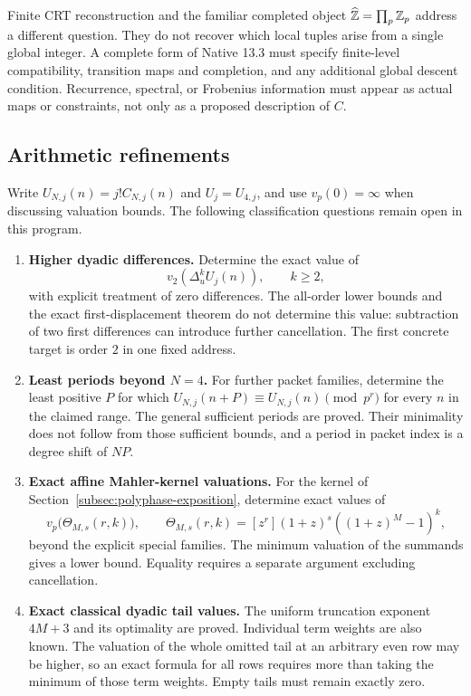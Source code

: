 Finite CRT reconstruction and the familiar completed object
$\widehat{\mathbb Z}=\prod_p\mathbb Z_p$ address a different question. They do not recover
which local tuples arise from a single global integer. A complete form of
Native 13.3 must specify finite-level compatibility, transition maps and
completion, and any additional global descent condition. Recurrence,
spectral, or Frobenius information must appear as actual maps or constraints,
not only as a proposed description of $C$.

\subsection{Arithmetic refinements}
\label{subsec:arithmetic-open}

Write $U_{N,j}(n)=j!C_{N,j}(n)$ and $U_j=U_{4,j}$, and use
$v_p(0)=\infty$ when discussing valuation bounds. The following classification
questions remain open in this program.

\begin{enumerate}
\item \textbf{Higher dyadic differences.}
Determine the exact value of
\[
v_2\!\left(\Delta_u^kU_j(n)\right),\qquad k\geq2,
\]
with explicit treatment of zero differences. The all-order lower bounds and
the exact first-displacement theorem do not determine this value: subtraction
of two first differences can introduce further cancellation. The first
concrete target is order $2$ in one fixed address.

\item \textbf{Least periods beyond $N=4$.}
For further packet families, determine the least positive $P$ for which
$U_{N,j}(n+P)\equiv U_{N,j}(n)\pmod{p^r}$ for every $n$ in the claimed range.
The general sufficient periods are proved. Their minimality does not follow
from those sufficient bounds, and a period in packet index is a degree shift
of $NP$.

\item \textbf{Exact affine Mahler-kernel valuations.}
For the kernel of Section~\ref{subsec:polyphase-exposition}, determine exact
values of
\[
v_p\bigl(\Theta_{M,s}(r,k)\bigr),\qquad
\Theta_{M,s}(r,k)=[z^r](1+z)^s((1+z)^M-1)^k,
\]
beyond the explicit special families. The minimum valuation of the summands
gives a lower bound. Equality requires a separate argument excluding
cancellation.

\item \textbf{Exact classical dyadic tail values.}
The uniform truncation exponent $4M+3$ and its optimality are proved.
Individual term weights are also known. The valuation of the whole omitted
tail at an arbitrary even row may be higher, so an exact formula for all rows
requires more than taking the minimum of those term weights. Empty tails
must remain exactly zero.
\end{enumerate}

